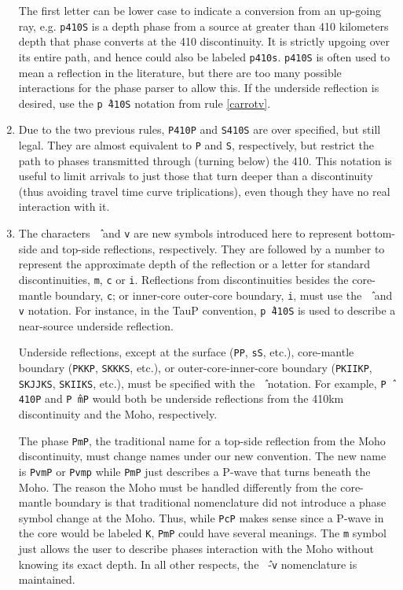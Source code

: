 \begin{enumerate}
The first letter can be lower case to indicate a conversion from
an up-going ray, e.g. \texttt{p410S} is a depth phase from 
a source at greater than 410 kilometers depth that phase converts
at the 410 discontinuity. 
It is strictly upgoing over
its entire path, and hence could also be labeled \texttt{p410s}.
\texttt{p410S} is often used to mean a reflection in the literature, but there
are too many possible interactions for the phase parser to allow this. 
If the underside reflection is desired, use the \texttt{p\^\,410S} notation from
rule \ref{carrotv}.

\item Due to the two previous rules, \texttt{P410P} and \texttt{S410S} 
are over specified, but still legal. 
They are almost equivalent to \texttt{P} and \texttt{S}, respectively,
but restrict the path to phases transmitted through (turning below) the 410.
This notation is useful to
limit arrivals to just those that turn deeper than a discontinuity (thus avoiding
travel time curve triplications), even though they have no real interaction with it.

\item \label{carrotv}
The characters \texttt{\^\,} and \texttt{v} are new symbols introduced here to
represent bottom-side and top-side reflections, respectively. 
They are followed by a number to 
represent the approximate depth of the reflection or
a letter for standard discontinuities, \texttt{m}, \texttt{c} or \texttt{i}. 
Reflections from discontinuities besides the
core-mantle boundary, \texttt{c}; 
or inner-core outer-core boundary, \texttt{i}, must use the \texttt{\^\,}
and \texttt{v} notation. 
For instance, in the TauP convention, \texttt{p\^\,410S} is used to describe
a near-source underside reflection.

Underside reflections, except at the 
surface (\texttt{PP}, \texttt{sS}, etc.), 
core-mantle boundary (\texttt{PKKP}, \texttt{SKKKS}, etc.), or 
outer-core-inner-core boundary (\texttt{PKIIKP}, \texttt{SKJJKS}, 
\texttt{SKIIKS}, etc.), must 
be specified with the \texttt{\^\,} notation. 
For example, \texttt{P\^\,410P} and 
\texttt{P\^\,mP} would both be underside 
reflections from the 410km discontinuity and the Moho, respectively.

The phase \texttt{PmP}, the traditional name for a top-side reflection from the Moho
discontinuity, must change names under our new convention.  
The new name is \texttt{PvmP} or \texttt{Pvmp} 
while \texttt{PmP} just describes a P-wave that turns beneath the Moho.
The reason the Moho must be handled differently from the core-mantle boundary is that
traditional nomenclature did not introduce a phase symbol change at the Moho.
Thus, while \texttt{PcP} makes sense since a P-wave in the core would be labeled
\texttt{K}, \texttt{PmP} could have several meanings.
The \texttt{m} symbol just allows the user to describe phases interaction with the Moho
without knowing its exact depth.  
In all other respects, the \texttt{\^\,}-\texttt{v} nomenclature is maintained.


\end{enumerate}
